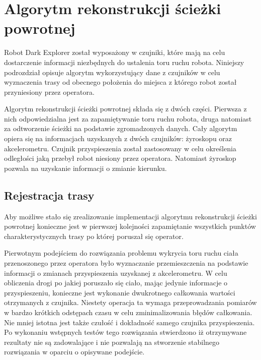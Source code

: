 \section{Algorytm rekonstrukcji ścieżki powrotnej}
\label{sec:rtrwca}
Robot Dark Explorer został wyposażony w czujniki, które mają na celu dostarczenie
informacji niezbędnych do ustalenia toru ruchu robota. Niniejszy podrozdział
opisuje algorytm wykorzystujący dane z czujników w celu wyznaczenia trasy od
obecnego położenia do miejsca z którego robot został przyniesiony przez
operatora.

Algorytm rekonstrukcji ścieżki powrotnej składa się z dwóch części. Pierwsza z
nich odpowiedzialna jest za zapamiętywanie toru ruchu robota, druga natomiast za
odtworzenie ścieżki na podstawie zgromadzonych danych. Cały algorytm opiera się
na informacjach uzyskanych z dwóch czujników: żyroskopu oraz akcelerometru.
Czujnik przyspieszenia został zastosowany w celu określenia odległości jaką
przebył robot niesiony przez operatora. Natomiast żyroskop pozwala na uzyskanie
informacji o zmianie kierunku.

\subsection{Rejestracja trasy}
Aby możliwe stało się zrealizowanie implementacji algorytmu rekonstrukcji
ścieżki powrotnej konieczne jest w pierwszej kolejności zapamiętanie wszystkich
punktów charakterystycznych trasy po której poruszał się operator.

Pierwotnym podejściem do rozwiązania problemu wykrycia toru ruchu ciała
przenoszonego przez operatora było wyznaczanie przemieszczenia na
podstawie informacji o zmianach przyspieszenia uzyskanej z akcelerometru.
W celu obliczenia drogi po jakiej poruszało się ciało, mając jedynie informacje 
o przyspieszeniu, konieczne jest wykonanie dwukrotnego całkowania wartości 
otrzymanych z czujnika. Niestety operacja ta wymaga przeprowadzania pomiarów w
bardzo krótkich odstępach czasu w celu zminimalizowania błędów całkowania.
Nie mniej istotna jest także czułość i dokładność samego czujnika
przyspieszenia. Po wykonaniu wstępnych testów tego rozwiązania stwierdzono iż
otrzymywane rezultaty nie są zadowalające  i nie pozwalają na stworzenie
stabilnego rozwiązania w oparciu o opisywane podejście. 

